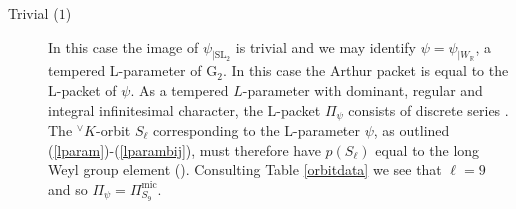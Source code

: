 \documentclass[a4paper, 11pt]{article}
\begin{document}
\begin{description}
\item[Trivial ($1$)] 
In this case the image of $\psi_{|\mathrm{SL}_{2}}$ is trivial and we may
identify $\psi = \psi_{|W_{\mathbb{R}}}$, a tempered
L-parameter of $\mathrm{G}_{2}$.  In this case the Arthur packet is
equal to the L-packet of $\psi$.  As a tempered $L$-parameter with
dominant, regular and integral infinitesimal character, 
the L-packet $\Pi_{\psi}$ consists of discrete series \cite[Theorem 14.91,
  Proposition 8.22]{Knapp}.    The ${^\vee}K$-orbit $S_{\ell}$ corresponding  to
the L-parameter $\psi$, as outlined (\ref{lparam})-(\ref{lparambij}), 
must therefore have $p(S_{\ell})$ equal to the long Weyl group element
(\cite[proof of Lemma 3.4]{Langlands}).   Consulting Table
\ref{orbitdata} we see that  $\ell  = 9$ and so
$\Pi_{\psi} = \Pi_{S_{9}}^{\mathrm{mic}}$.


\end{description}
\end{document}
